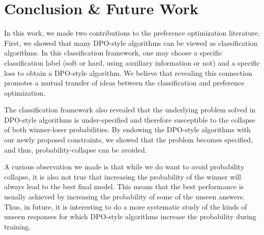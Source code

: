 \section{Conclusion \& Future Work}
In this work, we made two contributions to the preference optimization literature. First, we showed that many DPO-style algorithms can be viewed as classification algorithms. In this classification framework, one may choose a specific classification label (soft or hard, using auxiliary information or not) and a specific loss to obtain a DPO-style algorithm. We believe that revealing this connection promotes a mutual transfer of ideas between the classification and preference optimization.

The classification framework also revealed that the underlying problem solved in DPO-style algorithms is under-specified and therefore susceptible to the collapse of both winner-loser probabilities. By endowing the DPO-style algorithms with our newly proposed constraints, we showed that the problem becomes specified, and thus, probability-collapse can be avoided.

A curious observation we made is that while we do want to avoid probability collapse, it is also not true that increasing the probability of the winner will always lead to the best final model. This means that the best performance is usually achieved by increasing the probability of some of the unseen answers. Thus, in future, it is interesting to do a more systematic study of the kinds of unseen responses for which DPO-style algorithms increase the probability during training.